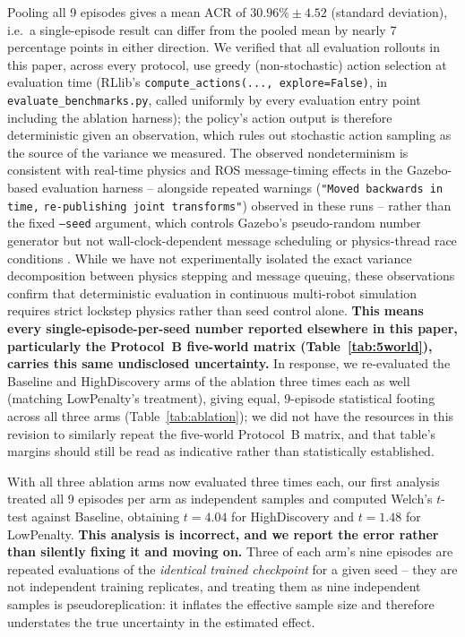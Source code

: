 \documentclass[11pt]{article}
\begin{document}
Pooling all 9 episodes gives a mean ACR of $30.96\% \pm 4.52$ (standard
deviation), i.e.\ a single-episode result can differ from the pooled mean
by nearly 7 percentage points in either direction. We verified that all
evaluation rollouts in this paper, across every protocol, use greedy
(non-stochastic) action selection at evaluation time
(RLlib's \texttt{compute\_actions(..., explore=False)}, in
\texttt{evaluate\_benchmarks.py}, called uniformly by every evaluation
entry point including the ablation harness); the policy's action output
is therefore deterministic given an observation, which rules out
stochastic action sampling as the source of the variance we measured. The
observed nondeterminism is consistent with real-time physics and ROS
message-timing effects in the Gazebo-based evaluation harness -- alongside
repeated warnings (\texttt{"Moved backwards in time,}
\texttt{re-publishing joint transforms"}) observed in these runs -- rather
than the fixed \texttt{--seed} argument, which controls Gazebo's
pseudo-random number generator but not wall-clock-dependent message
scheduling or physics-thread race conditions \cite{engstrom2020implementation,
henderson2018deep}. While we
have not experimentally isolated the exact variance decomposition between
physics stepping and message queuing, these observations confirm that
deterministic evaluation in continuous multi-robot simulation requires
strict lockstep physics rather than seed control alone.
\textbf{This means every single-episode-per-seed
number reported elsewhere in this paper, particularly the Protocol~B
five-world matrix (Table~\ref{tab:5world}), carries this same undisclosed
uncertainty.} In response, we re-evaluated the Baseline and HighDiscovery
arms of the ablation three times each as well (matching LowPenalty's
treatment), giving equal, 9-episode statistical footing across all three
arms (Table~\ref{tab:ablation}); we did not have the resources in this
revision to similarly repeat the five-world Protocol~B matrix, and that
table's margins should still be read as indicative rather than
statistically established.

With all three ablation arms now evaluated three times each, our first
analysis treated all 9 episodes per arm as independent samples and
computed Welch's $t$-test against Baseline, obtaining $t=4.04$ for
HighDiscovery and $t=1.48$ for LowPenalty. \textbf{This analysis is
incorrect, and we report the error rather than silently fixing it and
moving on.} Three of each arm's nine episodes are repeated evaluations of
the \emph{identical trained checkpoint} for a given seed -- they are not
independent training replicates, and treating them as nine independent
samples is pseudoreplication: it inflates the effective sample size and
therefore understates the true uncertainty in the estimated effect.
\end{document}
